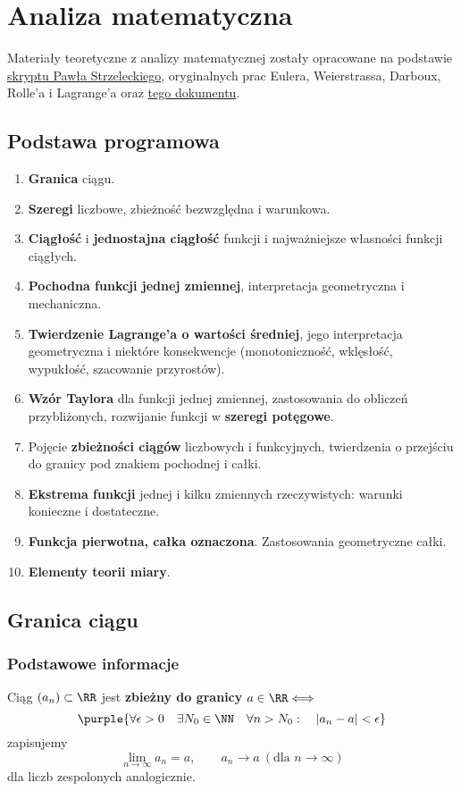 \chapter{Analiza matematyczna}

Materiały teoretyczne z analizy matematycznej zostały opracowane na podstawie \href{https://www.mimuw.edu.pl/~pawelst/dydaktyka/}{skryptu Pawła Strzeleckiego}, oryginalnych prac Eulera, Weierstrassa, Darboux, Rolle'a i Lagrange'a oraz \href{https://docs.google.com/document/d/1zH2fxnEpsVWZCMUf7qZtla7rl0BFxe-I6gzpkSep8nk}{tego dokumentu}.

\section*{Podstawa programowa}
\begin{enumerate}
    \item \textbf{Granica} ciągu.
    \item \textbf{Szeregi} liczbowe, zbieżność bezwzględna i warunkowa.
    \item \textbf{Ciągłość} i \textbf{jednostajna ciągłość} funkcji i najważniejsze własności funkcji ciągłych.
    \item \textbf{Pochodna funkcji jednej zmiennej}, interpretacja geometryczna i mechaniczna.
    \item \textbf{Twierdzenie Lagrange’a o wartości średniej}, jego interpretacja geometryczna i niektóre konsekwencje (monotoniczność, wklęsłość, wypukłość, szacowanie przyrostów).
    \item \textbf{Wzór Taylora} dla funkcji jednej zmiennej, zastosowania do obliczeń przybliżonych, rozwijanie funkcji w \textbf{szeregi potęgowe}.
    \item Pojęcie \textbf{zbieżności ciągów} liczbowych i funkcyjnych, twierdzenia o przejściu do granicy pod znakiem pochodnej i całki.
    \item \textbf{Ekstrema funkcji} jednej i kilku zmiennych rzeczywistych: warunki konieczne i dostateczne.
    \item \textbf{Funkcja pierwotna, całka oznaczona}. Zastosowania geometryczne całki.
    \item \textbf{Elementy teorii miary}.
\end{enumerate}

\section{Granica ciągu}
\subsection{Podstawowe informacje}
Ciąg $(a_n)\subset \RR$ jest \textbf{zbieżny do granicy} $a \in \RR \Longleftrightarrow$
$$
\purple{\forall \epsilon > 0 \quad \exists N_0 \in \NN \quad \forall n > N_0: \quad |a_n - a| < \epsilon}
$$
zapisujemy 
$$
\lim_{n\to\infty}a_n = a, \qquad a_n \to a \ (\mbox{dla } n\to\infty)
$$
dla liczb zespolonych analogicznie.

